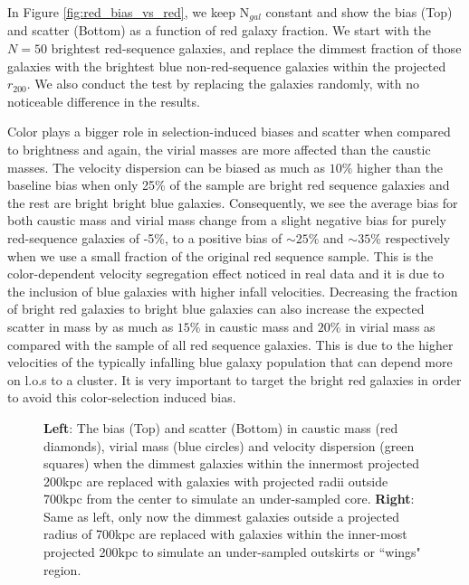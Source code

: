 \documentclass[iop]{emulateapj}
\begin{document}
In Figure \ref{fig:red_bias_vs_red}, we keep N$_{gal}$ constant and show the bias (Top) and scatter (Bottom) as a function of red galaxy fraction. We start with the $N = 50$ brightest red-sequence galaxies, and replace the dimmest fraction of those galaxies with the brightest blue non-red-sequence galaxies within the projected $r_{200}$. We also conduct the test by replacing the galaxies randomly, with no noticeable difference in the results. 

Color plays a bigger role in selection-induced biases and scatter when compared to brightness and again, the virial masses are more affected than the caustic masses. The velocity dispersion can be biased as much as $10\%$ higher than the baseline bias when only 25\% of the sample are bright red sequence galaxies and the rest are bright bright blue galaxies. Consequently, we see the average bias for both caustic mass and virial mass change from a slight negative bias for purely red-sequence galaxies of -5\%, to a positive bias of $\sim 25\%$ and $\sim 35\%$ respectively when we use a small fraction of the original red sequence sample. This is the color-dependent velocity segregation effect noticed in real data \citep{Carlberg97b,Goto05} and it is due to the inclusion of blue galaxies with higher infall velocities. Decreasing the fraction of bright red galaxies to bright blue galaxies can also increase the expected scatter in mass by as much as $15\%$ in caustic mass and $20\%$ in virial mass as compared with the sample of all red sequence galaxies. This is due to the higher velocities of the typically infalling blue galaxy population that can depend more on l.o.s to a cluster. It is very important to target the bright red galaxies in order to avoid this color-selection induced bias. 

\begin{figure*}
\caption{{\bf Left}: The bias (Top) and scatter (Bottom) in caustic mass (red diamonds), virial mass (blue circles) and velocity dispersion (green squares) when the dimmest galaxies within the innermost projected 200kpc are replaced with galaxies with projected radii outside 700kpc from the center to simulate an under-sampled core. {\bf Right}: Same as left, only now the dimmest galaxies outside a projected radius of 700kpc are replaced with galaxies within the inner-most projected 200kpc to simulate an under-sampled outskirts or ``wings" region.}
\label{fig:red_bias_vs_core}
\end{figure*}
\end{document}
